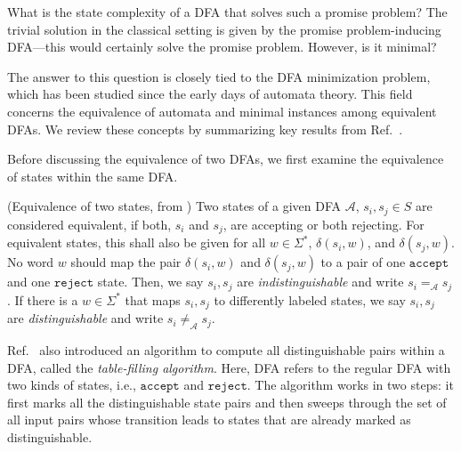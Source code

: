 \documentclass[../main.tex]{subfiles}
\begin{document}
What is the state complexity of a DFA that solves such a promise problem? The trivial solution in the classical setting is given by the promise problem-inducing \ac{DFA}—this would certainly solve the promise problem. However, is it minimal?

The answer to this question is closely tied to the DFA minimization problem, which has been studied since the early days of automata theory. This field concerns the equivalence of automata and minimal instances among equivalent \acp{DFA}. We review these concepts by summarizing key results from Ref.~\cite{hopcroft2001introduction}.

Before discussing the equivalence of two DFAs, we first examine the equivalence of states within the same \ac{DFA}.

\begin{definition}\label{def:equivstate} (Equivalence of two states, from \cite{hopcroft2001introduction}) 
    Two states of a given \ac{DFA} $\mathcal{A}$, $s_i, s_j \in S$ are considered equivalent, if both, $s_i$ and $s_j$, are accepting or both rejecting. For equivalent states, this shall also be given for all $w \in \Sigma^*$, $\delta(s_i,w)$, and $\delta(s_j,w)$. No word $w$ should map the pair $\delta(s_i,w)$ and $\delta(s_j,w)$ to a pair of one $\mathtt{accept}$ and one $\mathtt{reject}$  state. Then, we say  $s_i, s_j$ are \textit{indistinguishable} and write $s_i =_{\mathcal{A}} s_j$. If there is a $w \in \Sigma^*$ that maps $s_i, s_j$ to differently labeled states, we say  $s_i, s_j$ are \textit{distinguishable} and write $s_i \neq_{\mathcal{A} }s_j$. 
\end{definition}

Ref.~\cite{hopcroft2001introduction} also introduced an algorithm to compute all distinguishable pairs within a \ac{DFA}, called the \textit{table-filling algorithm}. Here, \ac{DFA} refers to the regular DFA with two kinds of states, i.e., $\mathtt{accept}$ and $\mathtt{reject}$. The algorithm works in two steps: it first marks all the distinguishable state pairs and then sweeps through the set of all input pairs whose transition leads to states that are already marked as distinguishable. 
\end{document}
